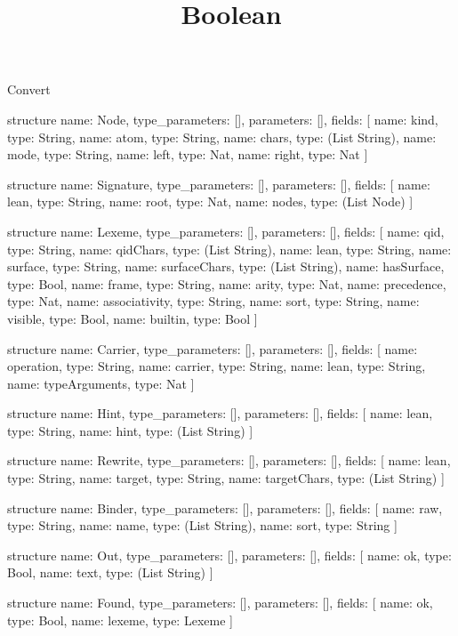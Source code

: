 \begin{lexlean}{Convert}
\title{Boolean}
\begin{semanticmodule}
structure{
  name: Node,
  type_parameters: [],
  parameters: [],
  fields: [
    {name: kind, type: String},
    {name: atom, type: String},
    {name: chars, type: (List String)},
    {name: mode, type: String},
    {name: left, type: Nat},
    {name: right, type: Nat}
  ]
}

structure{
  name: Signature,
  type_parameters: [],
  parameters: [],
  fields: [
    {name: lean, type: String},
    {name: root, type: Nat},
    {name: nodes, type: (List Node)}
  ]
}

structure{
  name: Lexeme,
  type_parameters: [],
  parameters: [],
  fields: [
    {name: qid, type: String},
    {name: qidChars, type: (List String)},
    {name: lean, type: String},
    {name: surface, type: String},
    {name: surfaceChars, type: (List String)},
    {name: hasSurface, type: Bool},
    {name: frame, type: String},
    {name: arity, type: Nat},
    {name: precedence, type: Nat},
    {name: associativity, type: String},
    {name: sort, type: String},
    {name: visible, type: Bool},
    {name: builtin, type: Bool}
  ]
}

structure{
  name: Carrier,
  type_parameters: [],
  parameters: [],
  fields: [
    {name: operation, type: String},
    {name: carrier, type: String},
    {name: lean, type: String},
    {name: typeArguments, type: Nat}
  ]
}

structure{
  name: Hint,
  type_parameters: [],
  parameters: [],
  fields: [
    {name: lean, type: String},
    {name: hint, type: (List String)}
  ]
}

structure{
  name: Rewrite,
  type_parameters: [],
  parameters: [],
  fields: [
    {name: lean, type: String},
    {name: target, type: String},
    {name: targetChars, type: (List String)}
  ]
}

structure{
  name: Binder,
  type_parameters: [],
  parameters: [],
  fields: [
    {name: raw, type: String},
    {name: name, type: (List String)},
    {name: sort, type: String}
  ]
}

structure{
  name: Out,
  type_parameters: [],
  parameters: [],
  fields: [
    {name: ok, type: Bool},
    {name: text, type: (List String)}
  ]
}

structure{
  name: Found,
  type_parameters: [],
  parameters: [],
  fields: [
    {name: ok, type: Bool},
    {name: lexeme, type: Lexeme}
  ]
}


\end{semanticmodule}
\end{lexlean}
